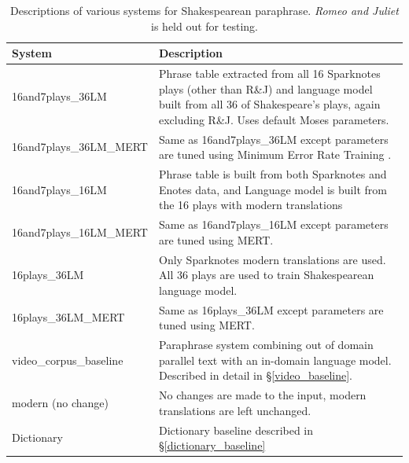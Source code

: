 \documentclass[10pt,a5paper,twoside]{article}
\begin{document}
\begin{table}[ht]
  \begin{center}
    \begin{tabular}{|l|p{3in}|}
      \hline
      System & Description \\
      \hline
      \hline
      16and7plays\_36LM & Phrase table extracted from all 16 Sparknotes plays (other than R\&J) and language model built from all 36 of Shakespeare's plays, again excluding R\&J.
      Uses default Moses parameters. \\
      \hline
      16and7plays\_36LM\_MERT & Same as 16and7plays\_36LM except parameters are tuned using Minimum Error Rate Training \cite{MERT}. \\
      \hline
      16and7plays\_16LM & Phrase table is built from both Sparknotes and Enotes data, and Language model is built from the 16 plays with modern translations\\
      \hline
      16and7plays\_16LM\_MERT & Same as 16and7plays\_16LM except parameters are tuned using MERT. \\
      \hline
      16plays\_36LM & Only Sparknotes modern translations are used.  All 36 plays are used to train Shakespearean language model.\\
      \hline
      16plays\_36LM\_MERT & Same as 16plays\_36LM except parameters are tuned using MERT. \\
      \hline
      video\_corpus\_baseline & Paraphrase system combining out of domain parallel text \cite{chen11} with an in-domain language model.  Described
      in detail in \S \ref{video_baseline}. \\
      \hline
      modern (no change) & No changes are made to the input, modern translations are left unchanged. \\
      \hline
      Dictionary & Dictionary baseline described in \S \ref{dictionary_baseline}\\
      \hline
    \end{tabular}
  \end{center}
  \caption{Descriptions of various systems for Shakespearean paraphrase.  {\em Romeo and Juliet} is held out for testing.}
  \label{systems}
\end{table}
\end{document}
